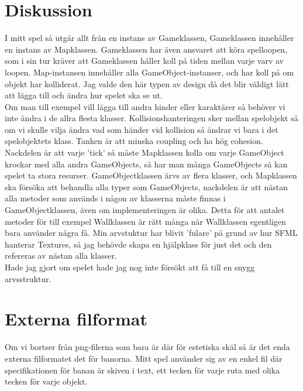 \documentclass{TDP005mall}
\begin{document}
\section{Diskussion}
I mitt spel så utgår allt från en instans av Gameklassen, Gameklassen innehåller en instans av Mapklassen. Gameklassen har även ansvaret att köra
spelloopen, som i sin tur kräver att Gameklassen håller koll på tiden mellan varje varv av loopen. 
Map-instansen innehåller alla GameObject-instanser, och har koll på om objekt har kolliderat.
Jag valde den här typen av design då det blir väldigt lätt att lägga till och ändra hur spelet ska se ut. \\
Om man till exempel vill lägga till andra hinder eller karaktärer så behöver vi inte ändra i de allra flesta klasser.
Kollisionshanteringen sker mellan spelobjekt så om vi skulle vilja ändra vad som händer vid kollision så ändrar vi bara i det spelobjektets klass.
Tanken är att minska coupling och ha hög cohesion.
Nackdelen är att varje 'tick' så måste Mapklassen kolla om varje GameObject krockar med alla andra GameObjects, 
så har man många GameObjects så kan spelet ta stora resurser. 
GameObjectklassen ärvs av flera klasser, och Mapklassen ska försöka att behandla alla typer som GameObjects, nackdelen är att nästan alla metoder 
som används i någon av klasserna måste finnas i GameObjectklassen, även om implementeringen är olika. Detta för att antalet metoder för till exempel 
Wallklassen är rätt många när Wallklassen egentligen bara använder några få.
Min arvstuktur har blivit 'fulare' på grund av hur SFML hanterar Textures, så jag behövde skapa en hjälpklass för just det och den refereras av 
nästan alla klasser. \\
Hade jag gjort om spelet hade jag nog inte försökt att få till en snygg arvsstruktur.

\section{Externa filformat}
Om vi bortser från png-filerna som bara är där för estetiska skäl så är det enda externa filformatet det för banorna.
Mitt spel använder sig av en enkel fil där specifikationen för banan är skiven i text, ett tecken för varje ruta med olika tecken för varje objekt.
\end{document}
